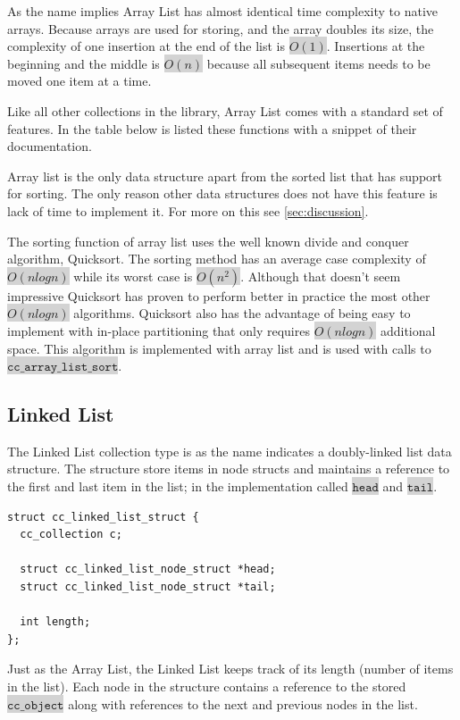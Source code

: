 \documentclass[table]{ituthesis}
\newcommand{\highlight}[1]{\colorbox{lightGray}{$\displaystyle \texttt{#1}$}}
\begin{document}
	As the name implies Array List has almost identical time complexity to native arrays. Because arrays are used for storing, and the array doubles its size, the complexity of one insertion at the end of the list is \highlight{$O(1)$}. Insertions at the beginning and the middle is \highlight{$O(n)$} because all subsequent items needs to be moved one item at a time.

	Like all other collections in the library, Array List comes with a standard set of features. In the table below is listed these functions with a snippet of their documentation.
	
	Array list is the only data structure apart from the sorted list that has support for sorting. The only reason other data structures does not have this feature is lack of time to implement it. For more on this see \autoref{sec:discussion}.

	The sorting function of array list uses the well known divide and conquer algorithm, Quicksort. The sorting method has an average case complexity of \highlight{$O(n log n)$} while its worst case is \highlight{$O(n^2)$}. Although that doesn't seem impressive Quicksort has proven to perform better in practice the most other \highlight{$O(n log n)$} algorithms. Quicksort also has the advantage of being easy to implement with in-place partitioning that only requires \highlight{$O(n log n)$} additional space. This algorithm is implemented with array list and is used with calls to \highlight{cc\_array\_list\_sort}.
	
	\subsection{Linked List}
	
	The Linked List collection type is as the name indicates a doubly-linked list data structure. The structure store items in node structs and maintains a reference to the first and last item in the list; in the implementation called \highlight{head} and \highlight{tail}.

\begin{lstlisting}[label=cc_linked_list-struct,caption=Internal representation of Linked List]
struct cc_linked_list_struct {
  cc_collection c;

  struct cc_linked_list_node_struct *head;
  struct cc_linked_list_node_struct *tail;

  int length;
};
\end{lstlisting}

	Just as the Array List, the Linked List keeps track of its length (number of items in the list). Each node in the structure contains a reference to the stored \highlight{cc\_object} along with references to the next and previous nodes in the list.
	
\end{document}

